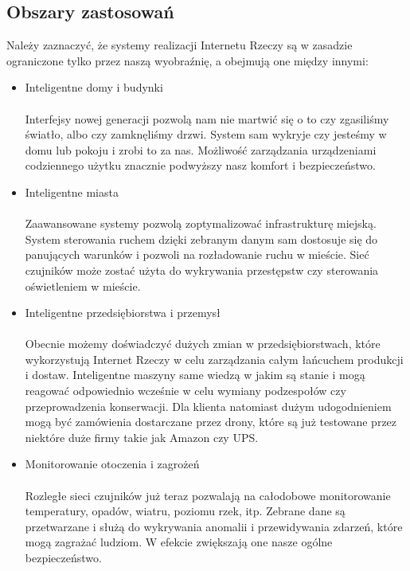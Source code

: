 \documentclass[12pt]{report}
\let\Oldsubsection\subsection
\renewcommand{\subsection}{\FloatBarrier\Oldsubsection}
\begin{document}
\subsection{Obszary zastosowań}
Należy zaznaczyć, że systemy realizacji Internetu Rzeczy są w zasadzie ograniczone tylko przez naszą wyobraźnię, a obejmują one między innymi:
\begin{itemize}
	\item Inteligentne domy i budynki \\ \\
	Interfejsy nowej generacji pozwolą nam nie martwić się o to czy zgasiliśmy światło, albo czy zamknęliśmy drzwi. System sam wykryje czy jesteśmy w domu lub pokoju i zrobi to za nas. Możliwość zarządzania urządzeniami codziennego użytku znacznie podwyższy nasz komfort i bezpieczeństwo.
	\item Inteligentne miasta \\ \\
	Zaawansowane systemy pozwolą zoptymalizować infrastrukturę miejską. System sterowania ruchem dzięki zebranym danym sam dostosuje się do panujących warunków i pozwoli na rozładowanie ruchu w mieście. Sieć czujników może zostać użyta do wykrywania przestępstw czy sterowania oświetleniem w mieście.
	\item Inteligentne przedsiębiorstwa i przemysł \\ \\
	Obecnie możemy doświadczyć dużych zmian w przedsiębiorstwach, które wykorzystują Internet Rzeczy w celu zarządzania całym łańcuchem produkcji i dostaw. Inteligentne maszyny same wiedzą w jakim są stanie i mogą reagować odpowiednio wcześnie w celu wymiany podzespołów czy przeprowadzenia konserwacji. Dla klienta natomiast dużym udogodnieniem mogą być zamówienia dostarczane przez drony, które są już testowane przez niektóre duże firmy takie jak Amazon czy UPS.
	\item Monitorowanie otoczenia i zagrożeń \\ \\
	Rozległe sieci czujników już teraz pozwalają na całodobowe monitorowanie temperatury, opadów, wiatru, poziomu rzek, itp. Zebrane dane są przetwarzane i służą do wykrywania anomalii i przewidywania zdarzeń, które mogą zagrażać ludziom. W efekcie zwiększają one nasze ogólne bezpieczeństwo.
\end{itemize}
\end{document}
